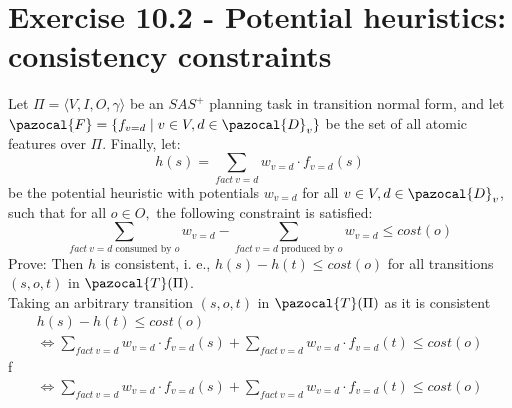 \documentclass[11pt,a4paper]{article}
\begin{document}
\section*{Exercise 10.2 - Potential heuristics: consistency constraints}
Let $\Pi = \langle V, I, O, \gamma \rangle$ be an $SAS^+$ planning task in transition normal form, and let $\pazocal{F} = \{f_{v=d} \mid v \in V, d \in \pazocal{D}_v\}$ be the set of all atomic features over $\Pi$. Finally, let:
\[h(s) = \sum_{fact\:v=d} w_{v=d} \cdot f_{v=d}(s) \]
be the potential heuristic with potentials $w_{v=d}$ for all $v \in V , d \in \pazocal{D}_v$, such that for all $o \in O,$ the following constraint is satisfied:
\[\sum_{fact\:v=d \text{ consumed by } o} w_{v=d} - \sum_{fact\:v=d \text{ produced by } o} w_{v=d} \leq cost(o)\]
Prove: Then $h$ is consistent, i. e., $h(s) - h(t) \leq cost(o)$ for all transitions $(s, o, t)$ in $\pazocal{T}(\Pi)$.\\

Taking an arbitrary transition $(s, o, t)$ in $\pazocal{T}(\Pi)$ as it is consistent\\
\begin{equation*}
	\begin{aligned}
		h(s) - h(t) \leq cost(o)\\
		\iff \sum_{fact\:v=d} w_{v=d} \cdot f_{v=d}(s) + \sum_{fact\:v=d} w_{v=d} \cdot f_{v=d}(t) \leq cost(o)
	\end{aligned}
\end{equation*}
f
\begin{equation*}
	\begin{aligned}
		\iff \sum_{fact\:v=d} w_{v=d} \cdot f_{v=d}(s) + \sum_{fact\:v=d} w_{v=d} \cdot f_{v=d}(t) \leq cost(o)\\
	\end{aligned}
\end{equation*}
\end{document}
